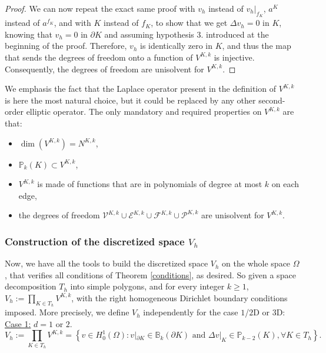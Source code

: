 \begin{proof}
We can now repeat the exact same proof with $v_h$ instead of $v_h|_{f_K}$, $a^K$ instead of $a^{f_K}$, and with $K$ instead of $f_K$, to show that we get $\Delta v_h = 0$ in $K$, knowing that $v_h = 0$ in $\partial K$ and assuming hypothesis $3.$ introduced at the beginning of the proof. Therefore, $v_h$ is identically zero in $K$, and thus the map that sends the degrees of freedom onto a function of $V^{K,k}$ is injective. Consequently, the degrees of freedom are unisolvent for $V^{K,k}$. 
\end{proof}

\begin{remark}
We emphasis the fact that the Laplace operator present in the definition of $V^{K,k}$ is here the most natural choice, but it could be replaced by any other second-order elliptic operator. The only mandatory and required properties on $V^{K,k}$ are that: 
\begin{itemize}
\item $\dim\left(V^{K,k}\right) = N^{K,k}$, 
\item $\mathbb{P}_{k}(K)\subset V^{K,k}$, 
\item $V^{K,k}$ is made of functions that are in polynomials of degree at most $k$ on each edge, 
\item the degrees of freedom $\mathcal{V}^{K,k}\cup\mathcal{E}^{K,k}\cup \mathcal{F}^{K,k}\cup\mathcal{P}^{K,k}$ are unisolvent for $V^{K,k}$.
\end{itemize}
\end{remark}

\subsubsection{Construction of the discretized space $V_h$}
Now, we have all the tools to build the discretized space $V_h$ on the whole space $\Omega$, that verifies all conditions of Theorem \ref{conditions}, as desired. So given a space decomposition $T_h$ into simple polygons, and for every integer $k\geq 1$, $V_h:=\prod_{K\in T_h} V^{K,k}$, with the right homogeneous Dirichlet boundary conditions imposed. More precisely, we define $V_h$ independently for the case $1$/$2$D or $3$D:\\

\noindent \underline{Case 1:} $d=1$ or $2$.
$$
V_h := \prod_{K\in T_h} V^{K,k} = \left\{v\in H^1_0(\Omega): v|_{\partial K} \in \mathbb{B}_k(\partial K) \text{ and } \Delta v|_K \in \mathbb{P}_{k-2}(K), \forall K\in T_h \right\}.
$$

